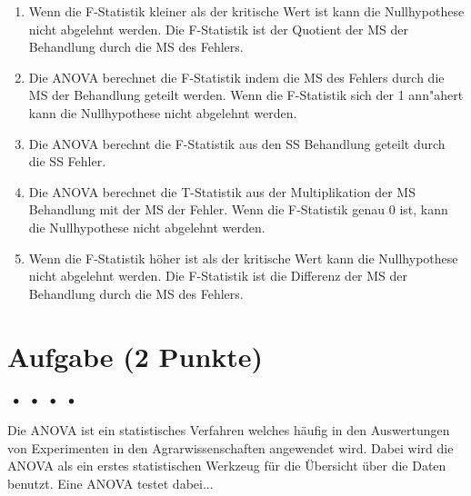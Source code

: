 \documentclass[a4paper, 9pt]{scrartcl}\usepackage[]{graphicx}\usepackage[]{xcolor}
\begin{document}
\begin{enumerate}
\item [\textbf{A} \msquare] Wenn die F-Statistik kleiner als der kritische Wert ist kann die Nullhypothese nicht abgelehnt werden. Die F-Statistik ist der Quotient der MS der Behandlung durch die MS des Fehlers.
\item [\textbf{B} \msquare] Die ANOVA berechnet die F-Statistik indem die MS des Fehlers durch die MS der Behandlung geteilt werden. Wenn die F-Statistik sich der 1 ann{"a}hert kann die Nullhypothese nicht abgelehnt werden.
\item [\textbf{C} \msquare] Die ANOVA berechnt die F-Statistik aus den SS Behandlung geteilt durch die SS Fehler.
\item [\textbf{D} \msquare] Die ANOVA berechnet die T-Statistik aus der Multiplikation der MS Behandlung mit der MS der Fehler. Wenn die F-Statistik genau 0 ist, kann die Nullhypothese nicht abgelehnt werden.
\item [\textbf{E} \msquare] Wenn die F-Statistik höher ist als der kritische Wert kann die Nullhypothese nicht abgelehnt werden. Die F-Statistik ist die Differenz der MS der Behandlung durch die MS des Fehlers.
\end{enumerate}

\section{Aufgabe \hfill (2 Punkte)}

\ifcollection
\begin{flushright}
\tiny\vspace{-2Ex}
\textbf{\examinhaltstart}
\exammodulemathstat $\;\bullet$
\exammodulestat $\;\bullet$
\exammodulestatbbv $\;\bullet$
\exammodulestatversuch $\;\bullet$
\exammodulebiostat
\vspace{-1Ex}
\end{flushright}
\fi




Die ANOVA ist ein statistisches Verfahren welches häufig in den Auswertungen von Experimenten in den Agrarwissenschaften angewendet
wird. Dabei wird die ANOVA als ein erstes statistischen Werkzeug für die
Übersicht über die Daten benutzt. Eine ANOVA testet dabei...
\end{document}
